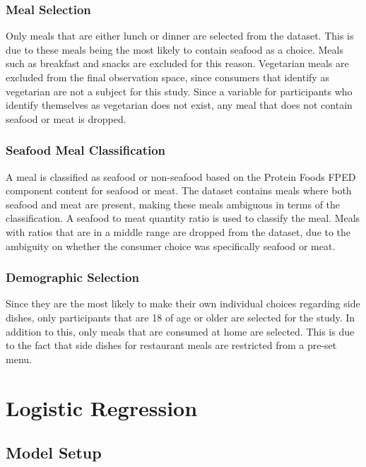 \documentclass{article}
\begin{document}
\subsubsection{Meal Selection}
\label{sssec:subsubhead}

Only meals that are either lunch or dinner are selected from the dataset. This is due to these meals being the most likely to contain seafood as a choice. Meals such as breakfast and snacks are excluded for this reason. Vegetarian meals are excluded from the final observation space, since consumers that identify as vegetarian are not a subject for this study. Since a variable for participants who identify themselves as vegetarian does not exist, any meal that does not contain seafood or meat is dropped.

\subsubsection{Seafood Meal Classification}
\label{sssec:subsubhead}

A meal is classified as seafood or non-seafood based on the Protein Foods FPED component content for seafood or meat. The dataset contains meals where both seafood and meat are present, making these meals ambiguous in terms of the classification. A seafood to meat quantity ratio is used to classify the meal. Meals with ratios that are in a middle range are dropped from the dataset, due to the ambiguity on whether the consumer choice was specifically seafood or meat. 

\subsubsection{Demographic Selection}
\label{sssec:subsubhead}

Since they are the most likely to make their own individual choices regarding side dishes, only participants that are 18 of age or older are selected for the study. In addition to this, only meals that are consumed at home are selected. This is due to the fact that side dishes for restaurant meals are restricted from a pre-set menu.

\section{Logistic Regression}
\label{sec:pagestyle}

\subsection{Model Setup}
\label{ssec:subhead}
\end{document}
